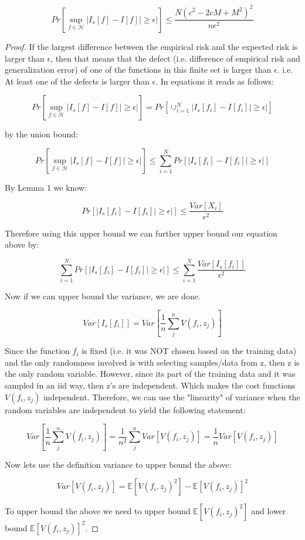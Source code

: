 \documentclass[12pt]{report}
\begin{document}
$$Pr[ \sup\limits_{f \in \mathcal{H}}  | I_s[f] - I[f] | \geq \epsilon|] \leq \frac{N(c^2-2cM+M^2)^2}{n \epsilon^2}$$
\begin{proof}

If the largest difference between the empirical risk and the expected risk is larger than $\epsilon$, then that means that the defect (i.e. difference of empirical risk and generalization error) of one of the functions in this finite set is larger than $\epsilon.$ 
i.e. At least one of the defects is larger than $\epsilon$. In equations it reads as follows:

$$Pr[ \sup\limits_{f \in \mathcal{H}}  | I_s[f] - I[f] | \geq \epsilon|] = Pr[\cup^{N}_{i=1} | I_s[f_i] - I[f_i] | \geq \epsilon|] $$

by the union bound:

$$Pr[ \sup\limits_{f \in \mathcal{H}}  | I_s[f] - I[f] | \geq \epsilon|]  \leq \sum^{N}_{i=1} Pr[| I_s[f_i] - I[f_i] | \geq \epsilon|] $$

By Lemma 1 we know:

$$ Pr[ | I_s[f_i] - I[f_i] | \geq \epsilon|] \leq \frac{ Var[X_i] }{ \epsilon^2 } $$

Therefore using this upper bound we can further upper bound our equation above by:

$$ \sum^{N}_{i=1} Pr[| I_s[f_i] - I[f_i] | \geq \epsilon|] \leq \sum^{N}_{i=1} \frac{ Var[I_s[f_i]] }{ \epsilon^2 }$$

Now if we can upper bound the variance, we are done.

$$ Var[I_s[f_i]] = Var[\frac{1}{n} \sum^n_j V(f_i,z_j)]$$

Since the function $f_i$ is fixed (i.e. it was NOT chosen based on the training data) and the only randomness involved is with selecting samples/data from z, then z is the only random variable. However, since its part of the training data and it was sampled in an iid way, then z's are independent. Which makes the cost functions $V(f_i,z_j)$ independent. Therefore, we can use the "linearity" of variance when the random variables are independent to yield the following statement:

$$ Var[\frac{1}{n} \sum^n_j V(f_i,z_j)] = \frac{1}{n^2} \sum^n_j Var[V(f_i,z_j)] = \frac{1}{n}Var[V(f_i,z_j)]  $$

Now lets use the definition variance to upper bound the above:

$$Var[V(f_i,z_j)] = \mathbb{E}[V(f_i,z_j)^2] - \mathbb{E}[V(f_i,z_j)]^2$$

To upper bound the above we need to upper bound $\mathbb{E}[V(f_i,z_j)^2]$ and lower bound $\mathbb{E}[V(f_i,z_j)]^2$. 


\end{proof}
\end{document}
